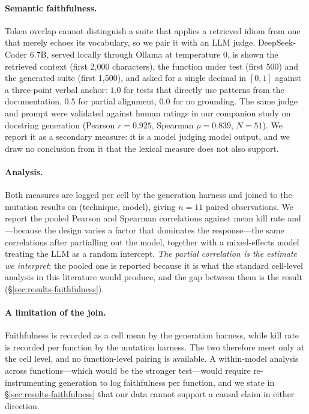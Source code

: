 \documentclass[smallextended]{svjour3}
\begin{document}
\paragraph{Semantic faithfulness.} Token overlap cannot distinguish a
suite that applies a retrieved idiom from one that merely echoes its
vocabulary, so we pair it with an LLM judge. DeepSeek-Coder 6.7B,
served locally through Ollama at temperature 0, is shown the
retrieved context (first 2{,}000 characters), the function under test
(first 500) and the generated suite (first 1{,}500), and asked for a
single decimal in $[0,1]$ against a three-point verbal anchor:
$1.0$ for tests that directly use patterns from the documentation,
$0.5$ for partial alignment, $0.0$ for no grounding. The same judge
and prompt were validated against human ratings in our companion
study on docstring generation (Pearson $r = 0.925$, Spearman
$\rho = 0.839$, $N = 51$). We report it as a secondary measure: it is
a model judging model output, and we draw no conclusion from it that
the lexical measure does not also support.

\paragraph{Analysis.} Both measures are logged per cell by the
generation harness and joined to the mutation results on
(technique, model), giving $n = 11$ paired observations. We report
the pooled Pearson and Spearman correlations against mean kill rate
and---because the design varies a factor that dominates the
response---the same correlations after partialling out the model,
together with a mixed-effects model treating the LLM as a random
intercept. \emph{The partial correlation is the estimate we
interpret}; the pooled one is reported because it is what the
standard cell-level analysis in this literature would produce, and
the gap between them is the result
(\S\ref{sec:results-faithfulness}).

\paragraph{A limitation of the join.} Faithfulness is recorded as a
cell mean by the generation harness, while kill rate is recorded per
function by the mutation harness. The two therefore meet only at the
cell level, and no function-level pairing is available. A
within-model analysis across functions---which would be the stronger
test---would require re-instrumenting generation to log faithfulness
per function, and we state in \S\ref{sec:results-faithfulness} that
our data cannot support a causal claim in either direction.
\end{document}
